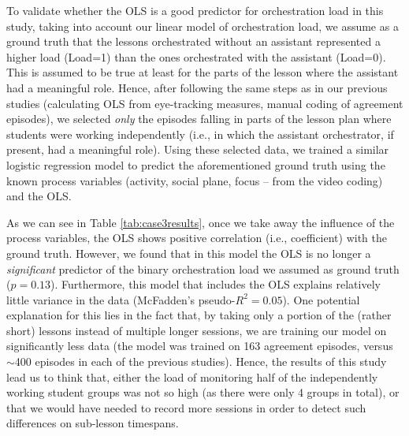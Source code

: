 \documentclass[10pt,journal,compsoc]{IEEEtran}
\begin{document}
To validate whether the OLS is a good predictor for orchestration load in this study, taking into account our linear model of orchestration load, we assume as a ground truth that the lessons orchestrated without an assistant represented a higher load (Load=1) than the ones orchestrated with the assistant (Load=0). This is assumed to be true at least for the parts of the lesson where the assistant had a meaningful role. Hence, after following the same steps as in our previous studies (calculating OLS from eye-tracking measures, manual coding of agreement episodes), we selected \textit{only} the episodes falling in parts of the lesson plan where students were working independently (i.e., in which the assistant orchestrator, if present, had a meaningful role). Using these selected data, we trained a similar logistic regression model to predict the aforementioned ground truth using the known process variables (activity, social plane, focus -- from the video coding) and the OLS.

As we can see in Table \ref{tab:case3results}, once we take away the influence of the process variables, the OLS shows positive correlation (i.e., coefficient) with the ground truth. However, we found that in this model the OLS is no longer a \textit{significant} predictor of the binary orchestration load we assumed as ground truth ($p=0.13$). Furthermore, this model that includes the OLS explains relatively little variance in the data (McFadden's pseudo-$R^2=0.05$). One potential explanation for this lies in the fact that, by taking only a portion of the (rather short) lessons instead of multiple longer sessions, we are training our model on significantly less data (the model was trained on 163 agreement episodes, versus $\sim$400 episodes in each of the previous studies). Hence, the results of this study lead us to think that, either the load of monitoring half of the independently working student groups was not so high (as there were only 4 groups in total), or that we would have needed to record more sessions in order to detect such differences on sub-lesson timespans.
\end{document}
